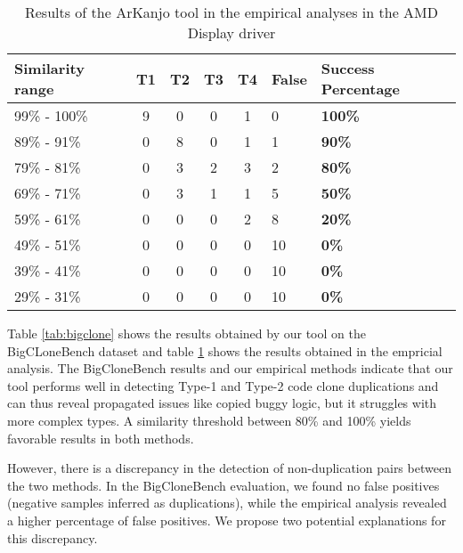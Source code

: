 \documentclass[conference]{IEEEtran}
\begin{document}
\begin{table}[!t]

\centering

\begin{tabular}{ | m{15mm} | c | c | c | c | m{6mm} | m{10mm} | }

\hline

\textbf{Similarity range} & \textbf{T1} & \textbf{T2} & T3 & T4
& \textbf{False} & \textbf{Success Percentage} \\ \hline
99\% - 100\% & 9 & 0 & 0 & 1 & 0 & \textbf{100\%} \\ \hline
89\% - 91\% & 0 & 8 & 0 & 1 & 1 & \textbf{90\%} \\ \hline
79\% - 81\% & 0 & 3 & 2 & 3 & 2 & \textbf{80\%} \\ \hline
69\% - 71\% & 0 & 3 & 1 & 1 & 5 & \textbf{50\%} \\ \hline
59\% - 61\% & 0 & 0 & 0 & 2 & 8 & \textbf{20\%} \\ \hline
49\% - 51\% & 0 & 0 & 0 & 0 & 10 & \textbf{0\%} \\ \hline
39\% - 41\% & 0 & 0 & 0 & 0 & 10 & \textbf{0\%} \\ \hline
29\% - 31\% & 0 & 0 & 0 & 0 & 10 & \textbf{0\%} \\ \hline

\hline

\end{tabular}
\caption{Results of the ArKanjo tool in the empirical analyses in the AMD Display driver}
\label{tab:emp}

\end{table}

Table \ref{tab:bigclone} shows the results obtained by our tool on the BigCLoneBench dataset
and table \ref{tab:emp} shows the results obtained in the empricial analysis.
The BigCloneBench results and our empirical methods indicate that our tool performs
well in detecting Type-1 and Type-2 code clone duplications and can thus reveal propagated 
issues like copied buggy logic, but it struggles with more
complex types. A similarity threshold between 80\% and 100\% yields favorable results
in both methods. 

However, there is a discrepancy in the detection of non-duplication pairs between
the two methods. In the BigCloneBench evaluation, we found no false positives (negative
samples inferred as duplications), while the empirical analysis revealed a higher percentage
of false positives. We propose two potential explanations for this discrepancy.
\end{document}
